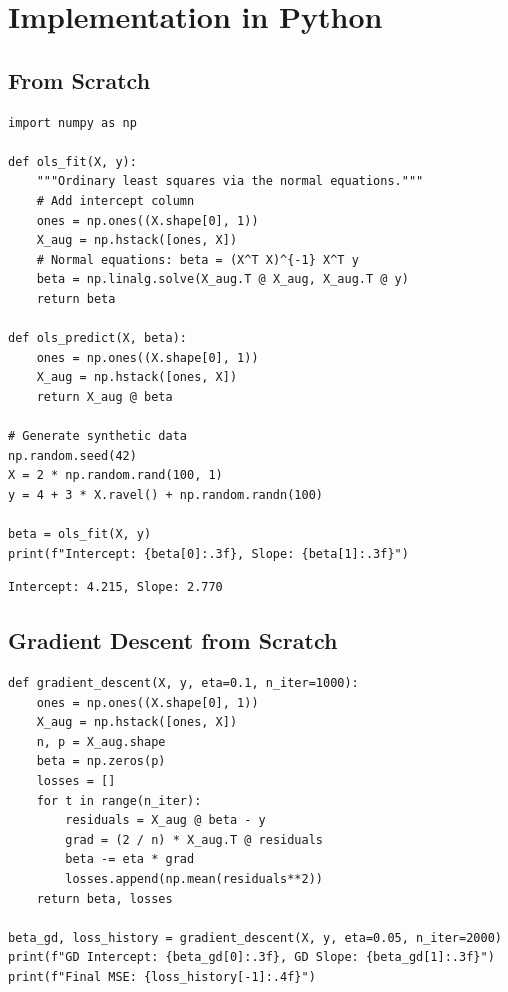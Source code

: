 \section{Implementation in Python}

\subsection{From Scratch}

\begin{codeblock}[title=\textbf{OLS from Scratch}]
\begin{verbatim}
import numpy as np

def ols_fit(X, y):
    """Ordinary least squares via the normal equations."""
    # Add intercept column
    ones = np.ones((X.shape[0], 1))
    X_aug = np.hstack([ones, X])
    # Normal equations: beta = (X^T X)^{-1} X^T y
    beta = np.linalg.solve(X_aug.T @ X_aug, X_aug.T @ y)
    return beta

def ols_predict(X, beta):
    ones = np.ones((X.shape[0], 1))
    X_aug = np.hstack([ones, X])
    return X_aug @ beta

# Generate synthetic data
np.random.seed(42)
X = 2 * np.random.rand(100, 1)
y = 4 + 3 * X.ravel() + np.random.randn(100)

beta = ols_fit(X, y)
print(f"Intercept: {beta[0]:.3f}, Slope: {beta[1]:.3f}")
\end{verbatim}
\end{codeblock}

\begin{codeoutput}
\begin{verbatim}
Intercept: 4.215, Slope: 2.770
\end{verbatim}
\end{codeoutput}

\subsection{Gradient Descent from Scratch}

\begin{codeblock}[title=\textbf{Gradient Descent Implementation}]
\begin{verbatim}
def gradient_descent(X, y, eta=0.1, n_iter=1000):
    ones = np.ones((X.shape[0], 1))
    X_aug = np.hstack([ones, X])
    n, p = X_aug.shape
    beta = np.zeros(p)
    losses = []
    for t in range(n_iter):
        residuals = X_aug @ beta - y
        grad = (2 / n) * X_aug.T @ residuals
        beta -= eta * grad
        losses.append(np.mean(residuals**2))
    return beta, losses

beta_gd, loss_history = gradient_descent(X, y, eta=0.05, n_iter=2000)
print(f"GD Intercept: {beta_gd[0]:.3f}, GD Slope: {beta_gd[1]:.3f}")
print(f"Final MSE: {loss_history[-1]:.4f}")
\end{verbatim}
\end{codeblock}

